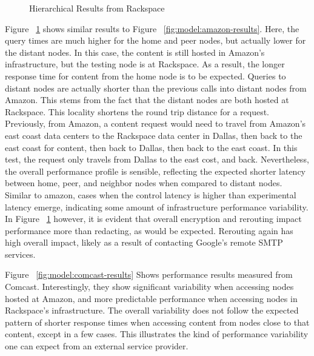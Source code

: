\begin{figure}[htbp]
\begin{minipage}[b]{0.5\linewidth}
\centering
{}
\end{minipage}
\begin{minipage}[b]{0.5\linewidth}
\centering
{}
\end{minipage}
\caption{Hierarchical Results from Rackspace}
\label{fig:model:rackspace-results}
\end{figure}

Figure ~\ref{fig:model:rackspace-results} shows similar results to Figure ~\ref{fig:model:amazon-results}.  Here, the query times are much higher for the home and peer nodes, but actually lower for the distant nodes.  In this case, the content is still hosted in Amazon's infrastructure, but the testing node is at Rackspace.  As a result, the longer response time for content from the home node is to be expected.  Queries to distant nodes are actually shorter than the previous calls into distant nodes from Amazon.  This stems from the fact that the distant nodes are both hosted at Rackspace.  This locality shortens the round trip distance for a request.  Previously, from Amazon, a content request would need to travel from Amazon's east coast data centers to the Rackspace data center in Dallas, then back to the east coast for content, then back to Dallas, then back to the east coast.  In this test, the request only travels from Dallas to the east cost, and back.  Nevertheless, the overall performance profile is sensible, reflecting the expected shorter latency between home, peer, and neighbor nodes when compared to distant nodes.  Similar to amazon, cases when the control latency is higher than experimental latency emerge, indicating some amount of infrastructure performance variability.  In Figure ~\ref{fig:model:rackspace-results} however, it is evident that overall encryption and rerouting impact performance more than redacting, as would be expected.  Rerouting again has high overall impact, likely as a result of contacting Google's remote SMTP services.

Figure ~\ref{fig:model:comcast-results} Shows performance results measured from Comcast.  Interestingly, they show significant variability when accessing nodes hosted at Amazon, and more predictable performance when accessing nodes in Rackspace's infrastructure.  The overall variability does not follow the expected pattern of shorter response times when accessing content from nodes close to that content, except in a few cases.  This illustrates the kind of performance variability one can expect from an external service provider.

